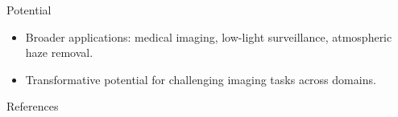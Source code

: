 \documentclass[aspectratio=169,xcolor=dvipsnames]{beamer}
\begin{document}
\begin{frame}{Potential}
\begin{itemize}
    \item Broader applications: medical imaging, low-light surveillance, atmospheric haze removal.
    \item Transformative potential for challenging imaging tasks across domains.
\end{itemize}
\end{frame}


\begin{frame}{References}
\nocite{*}


\end{frame}
\end{document}
